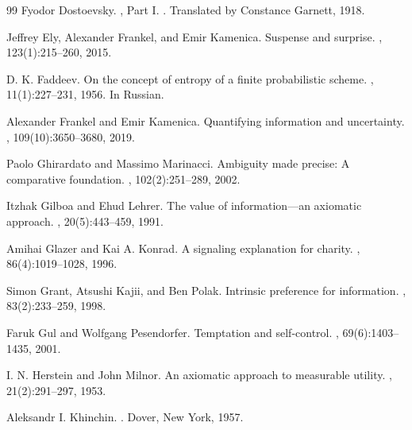 \documentclass[11pt,a4paper]{article}
\theoremstyle{definition}
\newcommand{\1}{\mathbf 1}
\begin{document}
\begin{thebibliography}{99}
Fyodor Dostoevsky.
, Part I.
.  Translated by Constance Garnett, 1918.

Jeffrey Ely, Alexander Frankel, and Emir Kamenica.
\newblock Suspense and surprise.
, 123(1):215--260, 2015.

D. K. Faddeev.
\newblock On the concept of entropy of a finite probabilistic scheme.
, 11(1):227--231, 1956.
\newblock In Russian.

Alexander Frankel and Emir Kamenica.
\newblock Quantifying information and uncertainty.
, 109(10):3650--3680, 2019.

Paolo Ghirardato and Massimo Marinacci.
\newblock Ambiguity made precise: A comparative foundation.
, 102(2):251--289, 2002.

Itzhak Gilboa and Ehud Lehrer.
\newblock The value of information---an axiomatic approach.
, 20(5):443--459, 1991.

Amihai Glazer and Kai A. Konrad.
\newblock A signaling explanation for charity.
, 86(4):1019--1028, 1996.

Simon Grant, Atsushi Kajii, and Ben Polak.
\newblock Intrinsic preference for information.
, 83(2):233--259, 1998.

Faruk Gul and Wolfgang Pesendorfer.
\newblock Temptation and self-control.
, 69(6):1403--1435, 2001.

I. N. Herstein and John Milnor.
\newblock An axiomatic approach to measurable utility.
, 21(2):291--297, 1953.


Aleksandr I. Khinchin.
.
\newblock Dover, New York, 1957.


\end{thebibliography}
\end{document}
